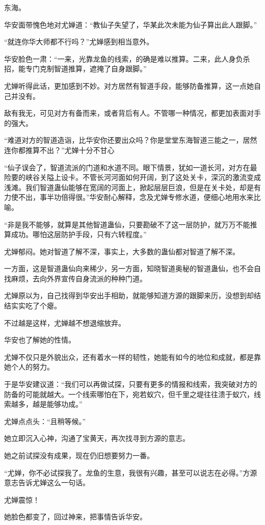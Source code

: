 \begin{this_body}
东海。

华安面带愧色地对尤婵道：“教仙子失望了，华某此次未能为仙子算出此人跟脚。”

“就连你华大师都不行吗？”尤婵感到相当意外。

华安脸色一肃：“一来，光靠龙鱼的线索，的确是难以推算。二来，此人身负杀招，能专门克制智道推算，遮掩了自身跟脚。”

尤婵听得此话，更加感到不妙。对方居然有智道手段，能够防备推算，这一点她自己并没有。

敌有我无，可见对方有备而来，或者背后有人。不管哪一种情况，都更加表面对手的强大。

“难道对方的智道造诣，比华安你还要出众吗？你是堂堂东海智道三能之一，居然连你都推算不出？”尤婵十分不甘心

“仙子误会了，智道流派的门道和水道不同。眼下情景，犹如一道长河，对方在最险要的峡谷关隘上设卡。不管长河河面如何开阔，到了这处关卡，深沉的激流变成浅滩。我们智道蛊仙能够在宽阔的河面上，掀起层层巨浪，但是在关卡处，却是有力使不出，事半功倍得很。”华安耐心解释，念及尤婵专修水道，便细心地用水来比喻。

“非是我不能够，就算是其他智道蛊仙，只要勘破不了这一层防护，就万万不能推算成功。哪怕这层防护手段，只有六转程度。”

尤婵郁闷。她对智道了解不深，事实上，大多数的蛊仙都对智道了解不深。

一方面，这是智道蛊仙向来稀少，另一方面，知晓智道奥秘的智道蛊仙，也不会自找麻烦，去向外界宣传自身流派的种种门道。

尤婵原以为，自己找得到华安出手相助，就能够知道方源的跟脚来历，没想到却结结实实吃了个瘪。

不过越是这样，尤婵越不想退缩放弃。

华安也了解她的性情。

尤婵不仅只是外貌出众，还有着水一样的韧性，她能有如今的地位和成就，都是靠她个人的努力。

于是华安建议道：“我们可以再做试探，只要有更多的情报和线索，我突破对方的防备的可能就越大。一个线索哪怕在下，宛若蚁穴，但千里之堤往往溃于蚁穴，线索越多，越是能够功成。”

尤婵点点头：“且稍等候。”

她立即沉入心神，沟通了宝黄天，再次找寻到方源的意志。

她之前试探没有成果，现在仍旧想要努力一番。

“尤婵，你不必试探我了。龙鱼的生意，我很有兴趣，甚至可以说志在必得。”方源意志告诉尤婵这么一句话。

尤婵震惊！

她脸色都变了，回过神来，把事情告诉华安。


\end{this_body}
